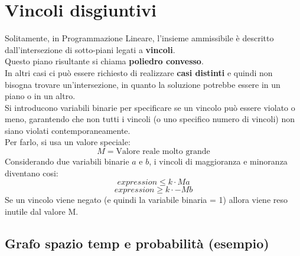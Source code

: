 \documentclass[12pt,a4paper]{article}
\let\oldsection\section
\renewcommand{\section}{\clearpage\oldsection}
\begin{document}
\section{Vincoli disgiuntivi}
Solitamente, in Programmazione Lineare, l'insieme ammissibile è descritto dall'intersezione di sotto-piani legati a \textbf{vincoli}.\\
Questo piano risultante si chiama \textbf{poliedro convesso}.\\
In altri casi ci può essere richiesto di realizzare \textbf{casi distinti} e quindi non bisogna trovare un'intersezione, in quanto la soluzione potrebbe essere in un piano o in un altro.\\
Si introducono variabili binarie per specificare se un vincolo può essere violato o meno, garantendo che non tutti i vincoli (o uno specifico numero di vincoli) non siano violati contemporaneamente.\\
Per farlo, si usa un valore speciale:
\[
M = \text{Valore reale molto grande}
\]
Considerando due variabili binarie $a$ e $b$, i vincoli di maggioranza e minoranza diventano cosi:
\[
expression \leq k \cdot Ma
\]
\[
expression \geq k \cdot -Mb
\]
Se un vincolo viene negato (e quindi la variabile binaria = 1) allora viene reso inutile dal valore M.
\subsection{Grafo spazio temp e probabilità (esempio)}
\end{document}
